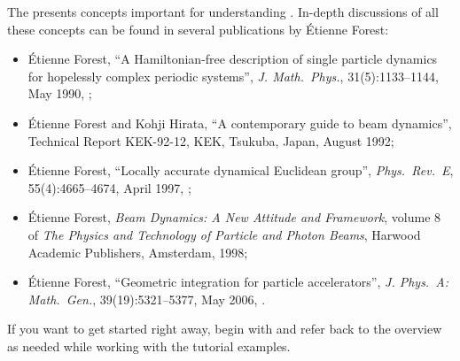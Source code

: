 The  presents concepts important for understanding \PTC.
In-depth discussions of all these concepts can be found in several
publications by \'Etienne Forest:
\begin{itemize}
  \item \'Etienne Forest,
``A Hamiltonian-free description of single particle dynamics for
hopelessly complex periodic systems'',
\emph{J. Math.\ Phys.}, 31(5):1133--1144, May 1990,
;

  \item \'Etienne Forest and Kohji Hirata,
``A contemporary guide to beam dynamics'',
Technical Report KEK-92-12, KEK, Tsukuba, Japan, August 1992;

  \item \'Etienne Forest,
``Locally accurate dynamical Euclidean group'',
\emph{Phys.\ Rev.\ E}, 55(4):4665--4674, April 1997,
;

  \item \'Etienne Forest,
\emph{Beam Dynamics: A New Attitude and Framework},
volume 8 of
\emph{The Physics and Technology of Particle and Photon Beams},
Harwood Academic Publishers, Amsterdam, 1998;

  \item \'Etienne Forest,
``Geometric integration for particle accelerators'',
\emph{J. Phys.\ A: Math.\ Gen.}, 39(19):5321--5377, May 2006,
.
\end{itemize}


If you want to get started right away, begin with 
and refer back to the overview as needed while working with the tutorial
examples.

\endinput
